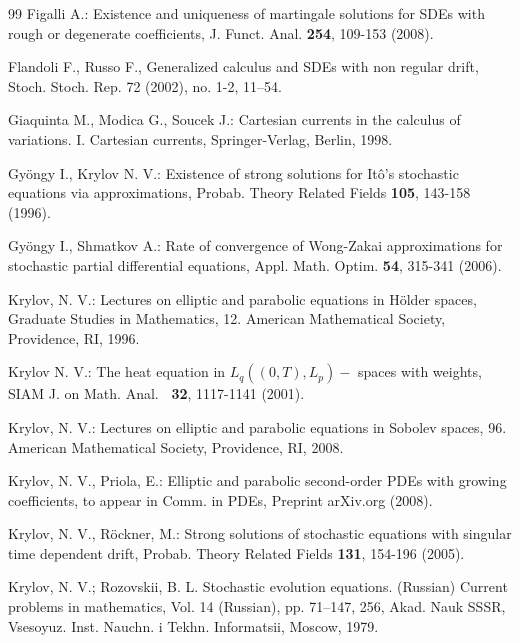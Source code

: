 \documentclass[a4paper,11pt]{article}
\begin{document}
\begin{thebibliography}{99}
  Figalli A.: Existence and uniqueness of martingale
solutions for SDEs with rough or degenerate coefficients, J. Funct. Anal.
\textbf{254}, 109-153 (2008).

  Flandoli F., Russo F., Generalized calculus and SDEs with non
regular drift, Stoch. Stoch. Rep. 72 (2002), no. 1-2, 11--54.

  Giaquinta M., Modica G., Soucek J.: Cartesian currents in the
calculus of variations. I. Cartesian currents, Springer-Verlag, Berlin, 1998.

  Gy\"{o}ngy I., Krylov N. V.: Existence of strong solutions for
It\^{o}'s stochastic equations via approximations, Probab. Theory Related
Fields \textbf{105}, 143-158 (1996).

  Gy\"{o}ngy I., Shmatkov A.: Rate of convergence of Wong-Zakai
approximations for stochastic partial differential equations, Appl. Math.
Optim. \textbf{54}, 315-341 (2006).

  Krylov, N. V.: Lectures on elliptic and parabolic equations
in H\"{o}lder spaces, Graduate Studies in Mathematics, 12. American
Mathematical Society, Providence, RI, 1996.



  Krylov N. V.: The heat equation in $L_{q}((0,T),L_{p})-$%
 spaces with weights, SIAM J. on Math. Anal. \textbf{\ 32}, 1117-1141 (2001).

 Krylov, N. V.: Lectures on elliptic and parabolic
  equations in Sobolev spaces,
 96. American
Mathematical Society, Providence, RI, 2008.


  Krylov, N. V., Priola, E.: Elliptic and parabolic second-order
PDEs with growing coefficients, to appear in Comm. in PDEs, Preprint
arXiv.org (2008).%

  Krylov, N. V., R\"{o}ckner, M.: Strong solutions of
stochastic equations with singular time dependent drift, Probab. Theory
Related Fields \textbf{131}, 154-196 (2005).

  Krylov, N. V.; Rozovskii, B. L. Stochastic evolution
equations. (Russian) Current problems in mathematics, Vol. 14 (Russian), pp.
71--147, 256, Akad. Nauk SSSR, Vsesoyuz. Inst. Nauchn. i Tekhn. Informatsii,
Moscow, 1979.


\end{thebibliography}
\end{document}
